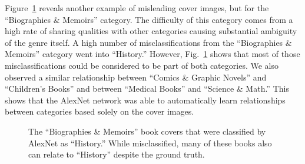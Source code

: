 \documentclass[conference]{IEEEtran}
\begin{document}
Figure~\ref{misclassbio} reveals another example of misleading cover images, but for the ``Biographies \& Memoirs'' category.
The difficulty of this category comes from a high rate of sharing qualities with other categories causing substantial ambiguity of the genre itself.
A high number of misclassifications from the ``Biographies \& Memoirs'' category went into ``History.''
However, Fig.~\ref{misclassbio} shows that most of those misclassifications could be considered to be part of both categories.
We also observed a similar relationship between ``Comics \& Graphic Novels'' and ``Children's Books'' and between ``Medical Books'' and ``Science \& Math.''
This shows that the AlexNet network was able to automatically learn relationships between categories based solely on the cover images.

\begin{figure}
\begin{center}
\setlength\fboxsep{0pt}
\setlength\fboxrule{0pt}
\end{center}
\begin{center}
\setlength\fboxsep{0pt}
\setlength\fboxrule{0pt}
\end{center}
\caption{\label{misclassbio} The ``Biographies \& Memoirs'' book covers that were classified by AlexNet as ``History.'' While misclassified, many of these books also can relate to ``History'' despite the ground truth. }
\end{figure}
\end{document}
